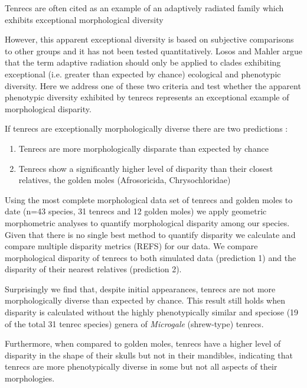 \documentclass[12pt,a4paper]{article}
\begin{document}
Tenrecs are often cited as an example of an adaptively radiated family which exhibits exceptional morphological diversity \citep{Soarimalala2011, Olson2003, Eisenberg1969}


However, this apparent exceptional diversity is based on subjective comparisons to other groups and it has not been tested quantitatively. Losos and Mahler \citeyearpar{Losos2010a} argue that the term adaptive radiation should only be applied to clades exhibiting exceptional (i.e. greater than expected by chance) ecological and phenotypic diversity.
Here we address one of these two criteria and test whether the apparent phenotypic diversity exhibited by tenrecs represents an exceptional example of morphological disparity. 

If tenrecs are exceptionally morphologically diverse there are two predictions \citep{Losos2010a}:   
\begin{enumerate}
\item Tenrecs are more morphologically disparate than expected by chance
\item Tenrecs show a significantly higher level of disparity than their closest relatives, the golden moles (Afrosoricida, Chrysochloridae)
\end{enumerate}

Using the most complete morphological data set of tenrecs and golden moles to date (n=43 species, 31 tenrecs and 12 golden moles) we apply geometric morphometric analyses \citep{Rohlf1993, Zelditch2012} to quantify morphological disparity among our species. Given that there is no single best method to quantify disparity \citep{Ciampaglio2001} we calculate and compare multiple disparity metrics (REFS) for our data. We compare morphological disparity of tenrecs to both simulated data (prediction 1) and the disparity of their nearest relatives (prediction 2).

Surprisingly we find that, despite initial appearances, tenrecs are not more morphologically diverse than expected by chance. This result still holds when disparity is calculated without the highly phenotypically similar and speciose (19 of the total 31 tenrec species) genera of \textit{Microgale} (shrew-type) tenrecs.

Furthermore, when compared to golden moles, tenrecs have a higher level of disparity in the shape of their skulls but not in their mandibles, indicating that tenrecs are more phenotypically diverse in some but not all aspects of their morphologies.
\end{document}
